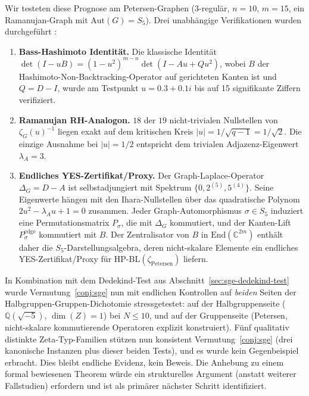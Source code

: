\documentclass[11pt]{article}
\theoremstyle{definition}
\theoremstyle{remark}
\newcommand{\HBL}{\mathrm{HP\text{-}BL}}
\begin{document}
Wir testeten diese Prognose am Petersen-Graphen (3-regulär, $n = 10$, $m = 15$,
ein Ramanujan-Graph mit $\mathrm{Aut}(G) = S_5$). Drei unabhängige
Verifikationen wurden durchgeführt \cite{IharaPetersenTest}:
\begin{enumerate}
\item[(V1)] \textbf{Bass-Hashimoto Identität.} Die klassische Identität
  $\det(I - uB) = (1 - u^2)^{m-n}\det(I - Au + Qu^2)$, wobei $B$ der
  Hashimoto-Non-Backtracking-Operator auf gerichteten Kanten ist und
  $Q = D - I$, wurde am Testpunkt $u = 0.3 + 0.1 i$ bis
  auf 15 signifikante Ziffern verifiziert.
\item[(V2)] \textbf{Ramanujan RH-Analogon.} $18$ der $19$ nicht-trivialen Nullstellen
  von $\zeta_G(u)^{-1}$ liegen exakt auf dem kritischen Kreis
  $|u| = 1/\sqrt{q-1} = 1/\sqrt{2}$. Die einzige Ausnahme bei $|u| = 1/2$
  entspricht dem trivialen Adjazenz-Eigenwert $\lambda_A = 3$.
\item[(V3)] \textbf{Endliches YES-Zertifikat/Proxy.} Der Graph-Laplace-Operator
  $\Delta_G = D - A$ ist selbstadjungiert mit Spektrum
  $\{0, 2^{(5)}, 5^{(4)}\}$. Seine Eigenwerte hängen mit den Ihara-Nullstellen
  über das quadratische Polynom $2u^2 - \lambda_A u + 1 = 0$ zusammen.
  Jeder Graph-Automorphismus $\sigma \in S_5$ induziert eine Permutationsmatrix $P_\sigma$,
  die mit $\Delta_G$ kommutiert, und der Kanten-Lift $P_\sigma^{\mathrm{edge}}$ kommutiert mit $B$.
  Der Zentralisator von $B$ in $\mathrm{End}(\mathbb{C}^{2m})$ enthält daher
  die $S_5$-Darstellungsalgebra, deren nicht-skalare Elemente ein
  endliches YES-Zertifikat/Proxy für
  $\HBL(\zeta_{\mathrm{Petersen}})$ liefern.
\end{enumerate}

In Kombination mit dem Dedekind-Test aus Abschnitt~\ref{sec:sge-dedekind-test}
wurde Vermutung~\ref{conj:sge} nun mit endlichen Kontrollen auf \emph{beiden}
Seiten der Halbgruppen-Gruppen-Dichotomie stressgetestet: auf der Halbgruppenseite
($\mathbb{Q}(\sqrt{-5})$, $\dim(Z) = 1$) bei $N \leq 10$, und auf der
Gruppenseite (Petersen, nicht-skalare kommutierende Operatoren explizit
konstruiert). Fünf qualitativ distinkte Zeta-Typ-Familien
stützen nun konsistent Vermutung~\ref{conj:sge} (drei kanonische Instanzen plus
dieser beiden Tests), und es wurde kein Gegenbeispiel erbracht. Dies bleibt
endliche Evidenz, kein Beweis.
Die Anhebung zu einem formal bewiesenen Theorem würde ein strukturelles
Argument (anstatt weiterer Fallstudien) erfordern und ist als primärer nächster
Schritt identifiziert.
\end{document}
